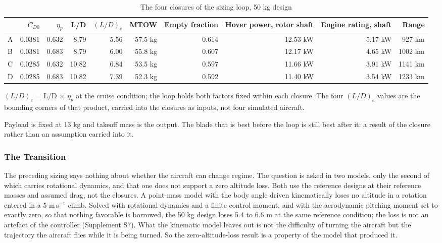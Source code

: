 \documentclass[journal]{new-aiaa}
\begin{document}
\begin{table}[htbp]
\centering
\caption{The four closures of the sizing loop, 50 kg design}
\label{tab:5}
\footnotesize
\begin{tabular}{lrrrrrrrrr}
\hline
 & $C_{D0}$ & $\eta_p$ & L/D & $(L/D)_e$ & MTOW & Empty fraction & Hover power, rotor shaft & Engine rating, shaft & Range \\ \hline
A & 0.0381 & 0.632 & 8.79 & 5.56 & 57.5 kg & 0.614 & 12.53 kW & 5.17 kW & 927 km \\
B & 0.0381 & 0.683 & 8.79 & 6.00 & 55.8 kg & 0.607 & 12.17 kW & 4.65 kW & 1002 km \\
C & 0.0285 & 0.632 & 10.82 & 6.84 & 53.5 kg & 0.597 & 11.66 kW & 3.91 kW & 1141 km \\
D & 0.0285 & 0.683 & 10.82 & 7.39 & 52.3 kg & 0.592 & 11.40 kW & 3.54 kW & 1233 km \\
\hline
\end{tabular}
\par\smallskip\parbox{\linewidth}{\footnotesize $(L/D)_e$ = L/D $\times$ $\eta_p$ at the cruise condition; the loop holds both factors fixed within each closure. The four $(L/D)_e$ values are the bounding corners of that product, carried into the closures as inputs, not four simulated aircraft.}
\end{table}

Payload is fixed at 13 kg and takeoff mass is the output. The blade that is best before the loop is still best after it: a result of the closure rather than an assumption carried into it.

\subsubsection{The Transition}

The preceding sizing says nothing about whether the aircraft can change regime. The question is asked in two models, only the second of which carries rotational dynamics, and that one does not support a zero altitude loss. Both use the reference designs at their reference masses and assumed drag, not the closures. A point-mass model with the body angle driven kinematically loses no altitude in a rotation entered in a 5 m\,s$^{-1}$ climb. Solved with rotational dynamics and a finite control moment, and with the aerodynamic pitching moment set to exactly zero, so that nothing favorable is borrowed, the 50 kg design loses 5.4 to 6.6 m at the same reference condition; the loss is not an artefact of the controller (Supplement S7). What the kinematic model leaves out is not the difficulty of turning the aircraft but the trajectory the aircraft flies while it is being turned. So the zero-altitude-loss result is a property of the model that produced it.
\end{document}
